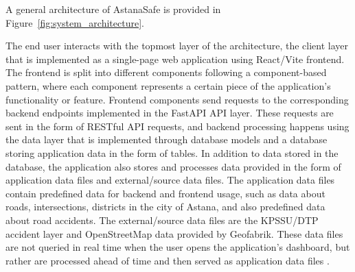 ﻿\documentclass[12pt,a4paper]{report}
\begin{document}
A general architecture of AstanaSafe is provided in Figure~\ref{fig:system_architecture}.

The end user interacts with the topmost layer of the architecture, the client layer that is implemented as a single-page web application using React/Vite frontend. The frontend is split into different components following a component-based pattern, where each component represents a certain piece of the application's functionality or feature. Frontend components send requests to the corresponding backend endpoints implemented in the FastAPI API layer. These requests are sent in the form of RESTful API requests, and backend processing happens using the data layer that is implemented through database models and a database storing application data in the form of tables. In addition to data stored in the database, the application also stores and processes data provided in the form of application data files and external/source data files. The application data files contain predefined data for backend and frontend usage, such as data about roads, intersections, districts in the city of Astana, and also predefined data about road accidents. The external/source data files are the KPSSU/DTP accident layer and OpenStreetMap data provided by Geofabrik. These data files are not queried in real time when the user opens the application's dashboard, but rather are processed ahead of time and then served as application data files \cite{kpssuDtp}.
\end{document}
